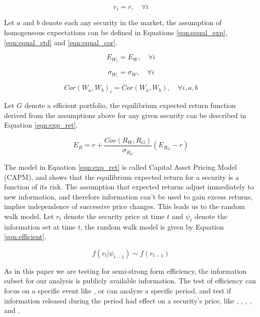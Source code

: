 \documentclass[cic,tc, english]{iiufrgs}
\begin{document}
    \begin{equation}
        \label{eqn:r}
        r_i = r, \quad \forall i
    \end{equation}

    Let $a$ and $b$ denote each any security in the market, the assumption of homogeneous expectations can be defined in Equations \ref{eqn:equal_exp}, \ref{eqn:equal_std} and \ref{eqn:equal_cor}.

    \begin{equation}
        \label{eqn:equal_exp}
        E_{W_i} = E_W, \quad \forall i
    \end{equation}

    \begin{equation}
        \label{eqn:equal_std}
        \sigma_{W_i} = \sigma_W, \quad \forall i
    \end{equation}

    \begin{equation}
        \label{eqn:equal_cor}
        Cor(W_a, W_b)_i = Cor(W_a, W_b), \quad \forall i, a, b
    \end{equation}

    Let $G$ denote a efficient portfolio, the equilibrium expected return function derived from the assumptions above for any given security can be described in Equation \ref{eqn:exp_ret}.

    \begin{equation}
        \label{eqn:exp_ret}
        E_R = r + \frac{Cov(R_W, R_G)}{\sigma_{R_G}} (E_{R_G} - r)
    \end{equation}

    The model in Equation \ref{eqn:exp_ret} is called Capital Asset Pricing Model (CAPM), and shows that the equilibrium expected return for a security is a function of its risk. The assumption that expected returns adjust immediately to new information, and therefore information can't be used to gain excess returns, implies independence of successive price changes. This leads us to the random walk model. Let $r_t$ denote the security price at time $t$ and $\psi_t$ denote the information set at time $t$, the random walk model is given by Equation \ref{eqn:efficient}.

    \begin{equation}
        \label{eqn:efficient}
        f ( r_t | \psi_{t-1} ) \sim f(r_{t-1})
    \end{equation}

    As in this paper we are testing for semi-strong form efficiency, the information subset for our analysis is publicly available information. The test of efficiency can focus on a specific event like \citet{gabrielribeiro2013}, or can analyze a specific period, and test if information released during the period had effect on a security's price, like \citet{caporaleetal2015}, \citet{mcqueenroley1993}, \citet{larsenthorsrud2017}, \citet{moussaetal2017}, \citet{smales2015} and \citet{marquessantos2016}.
\end{document}
